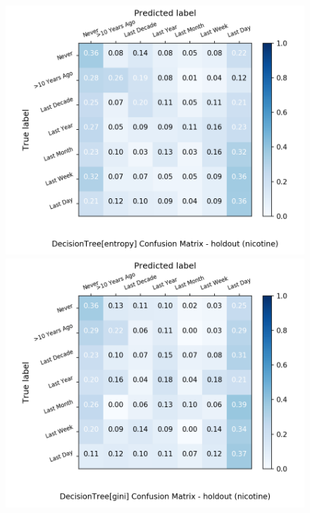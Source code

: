 \begin{figure}[H]
	\centering
	\begin{minipage}[b]{0.32\textwidth}
		\includegraphics[width=1.1\textwidth]{Plots/drugs/nicotine_DecisionTree_entropy_balance_False_holdout.png}
	\end{minipage}
	\begin{minipage}[b]{0.32\textwidth}
		\includegraphics[width=1.1\textwidth]{Plots/drugs/nicotine_DecisionTree_gini_balance_False_holdout.png}
	\end{minipage}

\end{figure}
